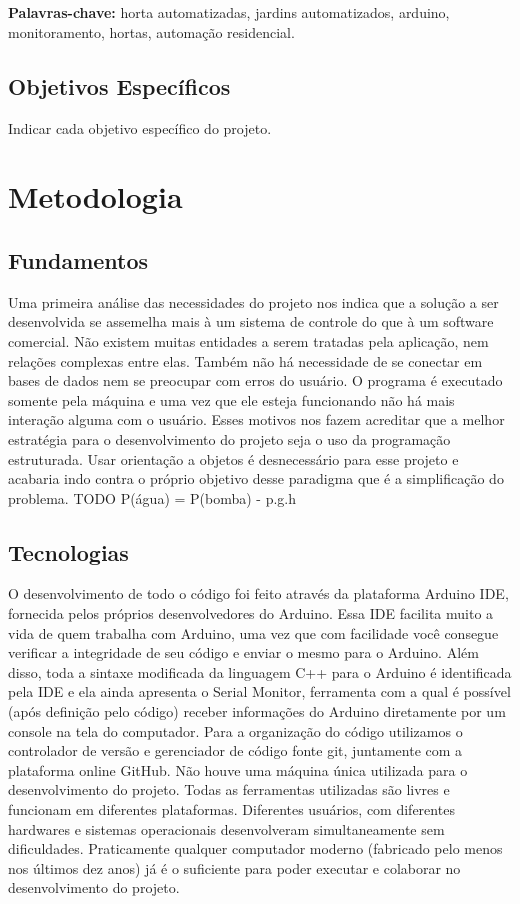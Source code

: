 \documentclass[a4paper,12pt]{article}
\begin{document}
	
  \textbf{\\\\Palavras-chave:} horta automatizadas, jardins automatizados, arduino, monitoramento, hortas, automação residencial.
  
\subsection{Objetivos Específicos}
Indicar cada objetivo específico do projeto.

\newpage

\section{Metodologia}
\subsection{Fundamentos}
Uma primeira análise das necessidades do projeto nos indica que a solução a ser desenvolvida se assemelha mais à um sistema de controle do que à um software comercial. Não existem muitas entidades a serem tratadas pela aplicação, nem relações complexas entre elas. Também não há necessidade de se conectar em bases de dados nem se preocupar com erros do usuário. O programa é executado somente pela máquina e uma vez que ele esteja funcionando não há mais interação alguma com o usuário. Esses motivos nos fazem acreditar que a melhor estratégia para o desenvolvimento do projeto seja o uso da programação estruturada. Usar orientação a objetos é desnecessário para esse projeto e acabaria indo contra o próprio objetivo desse paradigma que é a simplificação do problema. TODO P(água) = P(bomba) - p.g.h
\subsection{Tecnologias}
O desenvolvimento de todo o código foi feito através da plataforma Arduino IDE, fornecida pelos próprios desenvolvedores do Arduino. Essa IDE facilita muito a vida de quem trabalha com Arduino, uma vez que com facilidade você consegue verificar a integridade de seu código e enviar o mesmo para o Arduino. Além disso, toda a sintaxe modificada da linguagem C++ para o Arduino é identificada pela IDE e ela ainda apresenta o Serial Monitor, ferramenta com a qual é possível (após definição pelo código) receber informações do Arduino diretamente por um console na tela do computador. Para a organização do código utilizamos o controlador de versão e gerenciador de código fonte git, juntamente com a plataforma online GitHub. Não houve uma máquina única utilizada para o desenvolvimento do projeto. Todas as ferramentas utilizadas são livres e funcionam em diferentes plataformas. Diferentes usuários, com diferentes hardwares e sistemas operacionais desenvolveram simultaneamente sem dificuldades. Praticamente qualquer computador moderno (fabricado pelo menos nos últimos dez anos) já é o suficiente para poder executar e colaborar no desenvolvimento do projeto. 
\end{document}
